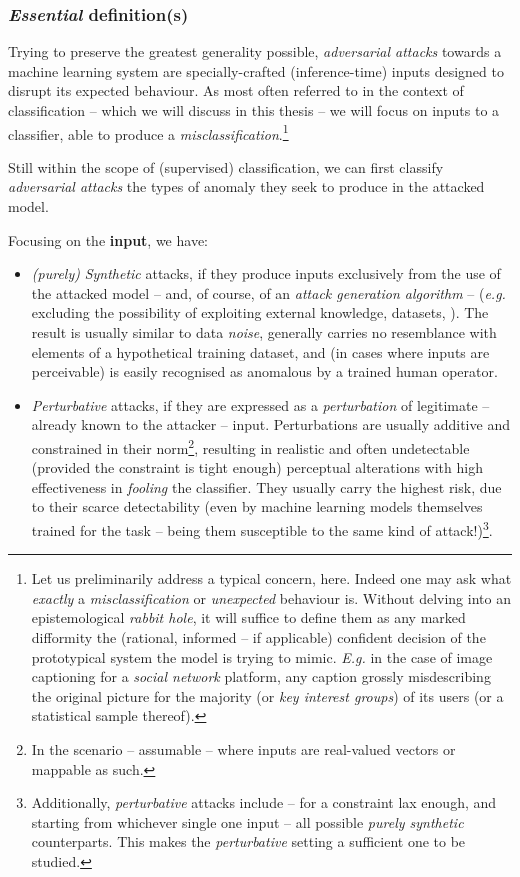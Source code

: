 \subsubsection{\textit{Essential} definition(s)}
Trying to preserve the greatest generality possible, \textit{adversarial attacks} towards a machine learning system are specially-crafted (inference-time) inputs designed to disrupt its expected behaviour. As most often referred to in the context of classification -- which we will discuss in this thesis -- we will focus on inputs to a classifier, able to produce a \textit{misclassification}.\footnote{Let us preliminarily address a typical concern, here. Indeed one may ask what \textit{exactly} a \textit{misclassification} or \textit{unexpected} behaviour is. Without delving into an epistemological \textit{rabbit hole}, it will suffice to define them as any marked difformity \wrt the (rational, informed -- if applicable) confident decision of the prototypical system the model is trying to mimic. \textit{E.g.} in the case of image captioning for a \textit{social network} platform, any caption grossly misdescribing the original picture for the majority (or \textit{key interest groups}) of its users (or a statistical sample thereof).}

Still within the scope of (supervised) classification, we can first classify \textit{adversarial attacks} \wrt the types of anomaly they seek to produce in the attacked model.

Focusing on the \textbf{input}, we have:
\begin{itemize}
    \item \textit{(purely)} \textit{Synthetic} attacks, if they produce inputs exclusively from the use of the attacked model -- and, of course, of an \textit{attack generation algorithm} -- (\textit{e.g.} excluding the possibility of exploiting external knowledge, datasets, \etc). The result is usually similar to data \textit{noise}, generally carries no resemblance with elements of a hypothetical training dataset, and (in cases where inputs are perceivable) is easily recognised as anomalous by a trained human operator.
    \item \textit{Perturbative} attacks, if they are expressed as a \textit{perturbation} of legitimate -- already known to the attacker -- input. Perturbations are usually additive and constrained in their norm\footnote{In the scenario -- assumable \wlogg -- where inputs are real-valued vectors or mappable as such.}, resulting in realistic and often undetectable (provided the constraint is tight enough) perceptual alterations with high effectiveness in \textit{fooling} the classifier. They usually carry the highest risk, due to their scarce detectability (even by machine learning models themselves trained for the task -- being them susceptible to the same kind of attack!)\footnote{Additionally, \textit{perturbative} attacks include -- for a constraint lax enough, and starting from whichever single one input -- all possible \textit{purely synthetic} counterparts. This makes the \textit{perturbative} setting a sufficient one to be studied.}.
\end{itemize}

